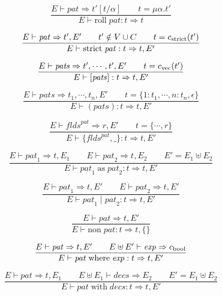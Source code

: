 \documentclass[twoside]{article}
\newcommand{\x}[1]{\mathit{#1}}
\newcommand{\f}[1]{\mbox{#1}}
\renewcommand{\c}[1]{c_{\f{\scriptsize #1}}}
\renewcommand{\exp}{\x{exp}}
\newcommand{\flds}{\x{flds}}
\newcommand{\pat}{\x{pat}}
\newcommand{\pats}{\x{pats}}
\newcommand{\decs}{\x{decs}}
\begin{document}
\begin{equation}
\frac{
E \vdash \pat \Rightarrow t'[t/\alpha]
\qquad
t = \mu \alpha.t'
}{
E \vdash \f{roll}\;\pat : t \Rightarrow t
}
\end{equation}

\begin{equation}
\frac{
E \vdash \pat \Rightarrow t',E'
\qquad
t' \notin V \cup C
\qquad
t = \c{strict}(t')
}{
E \vdash \f{strict}\;\pat : t \Rightarrow t,E'
}
\end{equation}

\begin{equation}
\frac{
E \vdash \pats \Rightarrow t',\cdots,t',E'
\qquad
t = \c{vec}(t')
}{
E \vdash [\pats] : t \Rightarrow t,E'
}
\end{equation}

\begin{equation}
\frac{
E \vdash \pats \Rightarrow t_1,\cdots,t_n,E'
\qquad
t = \{1:t_1,\cdots,n:t_n,\epsilon\}
}{
E \vdash (\pats) : t \Rightarrow t,E'
}
\end{equation}

\begin{equation}
\frac{
E \vdash \flds^\pat \Rightarrow r,E'
\qquad
t = \{\cdots,r\}
}{
E \vdash \{\flds^\pat,\_\} : t \Rightarrow t,E'
}
\end{equation}

\begin{equation}
\frac{
E \vdash \pat_1 \Rightarrow t,E_1
\qquad
E \vdash \pat_2 \Rightarrow t,E_2
\qquad
E' = E_1 \uplus E_2
}{
E \vdash \pat_1\;\f{as}\;\pat_2 : t \Rightarrow t,E'
}
\end{equation}

\begin{equation}
\frac{
E \vdash \pat_1 \Rightarrow t,E'
\qquad
E \vdash \pat_2 \Rightarrow t,E'
}{
E \vdash \pat_1\;|\;\pat_2 : t \Rightarrow t,E'
}
\end{equation}

\begin{equation}
\frac{
E \vdash \pat \Rightarrow t,E'
}{
E \vdash \f{non}\;\pat : t \Rightarrow t,\{\}
}
\end{equation}

\begin{equation}
\frac{
E \vdash \pat \Rightarrow t,E'
\qquad
E \uplus E' \vdash \exp \Rightarrow \c{bool}
}{
E \vdash \pat\;\f{where}\;\exp : t \Rightarrow t,E'
}
\end{equation}

\begin{equation}
\frac{
E \vdash \pat \Rightarrow t,E_1
\qquad
E \uplus E_1 \vdash \decs \Rightarrow E_2
\qquad
E' = E_1 \uplus E_2
}{
E \vdash \pat\;\f{with}\;\decs : t \Rightarrow t,E'
}
\end{equation}
\end{document}
